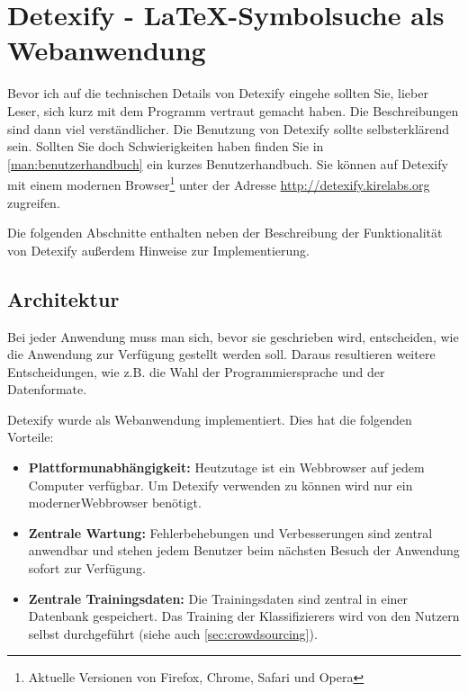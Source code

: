 \chapter[Detexify]{Detexify - \LaTeX-Symbolsuche als Webanwendung} %
\label{cha:detexify}

Bevor ich auf die technischen Details von Detexify eingehe sollten Sie, lieber Leser, sich kurz mit dem Programm vertraut gemacht haben. Die Beschreibungen sind dann viel verständlicher. Die Benutzung von Detexify sollte selbsterklärend sein. Sollten Sie doch Schwierigkeiten haben finden Sie in \ref{man:benutzerhandbuch} ein kurzes Benutzerhandbuch. Sie können auf Detexify mit einem modernen Browser\footnote{Aktuelle Versionen von Firefox, Chrome, Safari und Opera} unter der Adresse \url{http://detexify.kirelabs.org} zugreifen.

Die folgenden Abschnitte enthalten neben der Beschreibung der Funktionalität von Detexify außerdem Hinweise zur Implementierung.

\section{Architektur} %
\label{sec:architektur}

Bei jeder Anwendung muss man sich, bevor sie geschrieben wird, entscheiden, wie die Anwendung zur Verfügung gestellt werden soll. Daraus resultieren weitere Entscheidungen, wie z.B. die Wahl der Programmiersprache und der Datenformate.

Detexify wurde als Webanwendung implementiert. Dies hat die folgenden Vorteile:

\begin{itemize}
  \item \textbf{Plattformunabhängigkeit:} Heutzutage ist ein Webbrowser auf jedem Computer verfügbar. Um Detexify verwenden zu können wird nur ein moderner\footnotemark[1] Webbrowser benötigt.
  \item \textbf{Zentrale Wartung:} Fehlerbehebungen und Verbesserungen sind zentral anwendbar und stehen jedem Benutzer beim nächsten Besuch der Anwendung sofort zur Verfügung.
  \item \textbf{Zentrale Trainingsdaten:} Die Trainingsdaten sind zentral in einer Datenbank gespeichert. Das Training der Klassifizierers wird von den Nutzern selbst durchgeführt (siehe auch \ref{sec:crowdsourcing}).
\end{itemize}

